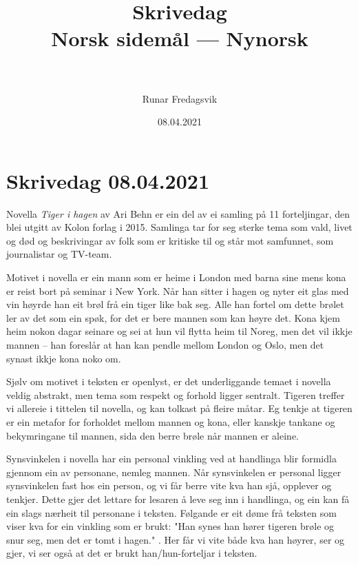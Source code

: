 \documentclass[12pt, a4paper, oneside, openany]{article}
\title{
    {Skrivedag}\\
    {\Large Norsk sidemål — Nynorsk}\\
    {\hspace{1ex}}\\
    {\hspace{5ex}}
}
\author{Runar Fredagsvik}
\date{08.04.2021}
\begin{document}
\begin{titlepage}

\maketitle

\end{titlepage}

\section*{Skrivedag 08.04.2021}

\noindent Novella \textit{Tiger i hagen} av Ari Behn er ein del av ei samling på 11 forteljingar, den blei utgitt av Kolon forlag i 2015. Samlinga tar for seg sterke tema som vald, livet og død og beskrivingar av folk som er kritiske til og står mot samfunnet, som journalistar og TV-team.

Motivet i novella er ein mann som er heime i London med barna sine mens kona er reist bort på seminar i New York. Når han sitter i hagen og nyter eit glas med vin høyrde han eit brøl frå ein tiger like bak seg. Alle han fortel om dette brølet ler av det som ein spøk, for det er bere mannen som kan høyre det. Kona kjem heim nokon dagar seinare og sei at hun vil flytta heim til Noreg, men det vil ikkje mannen – han foreslår at han kan pendle mellom London og Oslo, men det synast ikkje kona noko om.

Sjølv om motivet i teksten er openlyst, er det underliggande temaet i novella veldig abstrakt, men tema som respekt og forhold ligger sentralt. Tigeren treffer vi allereie i tittelen til novella, og kan tolkast på fleire måtar. Eg tenkje at tigeren er ein metafor for forholdet mellom mannen og kona, eller kanskje tankane og bekymringane til mannen, sida den berre brøle når mannen er aleine.

Synsvinkelen i novella har ein personal vinkling ved at handlinga blir formidla gjennom ein av personane, nemleg mannen. Når synsvinkelen er personal ligger synsvinkelen fast hos ein person, og vi får berre vite kva han sjå, opplever og tenkjer. Dette gjer det lettare for lesaren å leve seg inn i handlinga, og ein kan få ein slags nærheit til personane i teksten. Følgande er eit døme frå teksten som viser kva for ein vinkling som er brukt: "Han synes han hører tigeren brøle og snur seg, men det er tomt i hagen." \parencite{behn15}. Her får vi vite både kva han høyrer, ser og gjer, vi ser også at det er brukt han/hun-forteljar i teksten.
\end{document}
